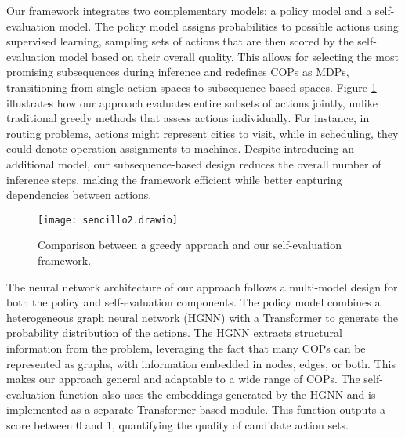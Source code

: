 Our framework integrates two complementary models: a policy model and a self-evaluation model. The policy model assigns probabilities to possible actions using supervised learning, sampling sets of actions that are then scored by the self-evaluation model based on their overall quality. This allows for selecting the most promising subsequences during inference and redefines COPs as MDPs, transitioning from single-action spaces to subsequence-based spaces. Figure \ref{fig:selfevaluationsimple} illustrates how our approach evaluates entire subsets of actions jointly, unlike traditional greedy methods that assess actions individually. For instance, in routing problems, actions might represent cities to visit, while in scheduling, they could denote operation assignments to machines. Despite introducing an additional model, our subsequence-based design reduces the overall number of inference steps, making the framework efficient while better capturing dependencies between actions.

 \begin{figure}[h] \centering \texttt{[image: sencillo2.drawio]} \caption{Comparison between a greedy approach and our self-evaluation framework.} \label{fig:selfevaluationsimple} \end{figure}

The neural network architecture of our approach follows a multi-model design for both the policy and self-evaluation components. The policy model combines a heterogeneous graph neural network (HGNN) with a Transformer to generate the probability distribution of the actions. The HGNN extracts structural information from the problem, leveraging the fact that many COPs can be represented as graphs, with information embedded in nodes, edges, or both. This makes our approach general and adaptable to a wide range of COPs. The self-evaluation function also uses the embeddings generated by the HGNN and is implemented as a separate Transformer-based module. This function outputs a score between 0 and 1, quantifying the quality of candidate action sets.

